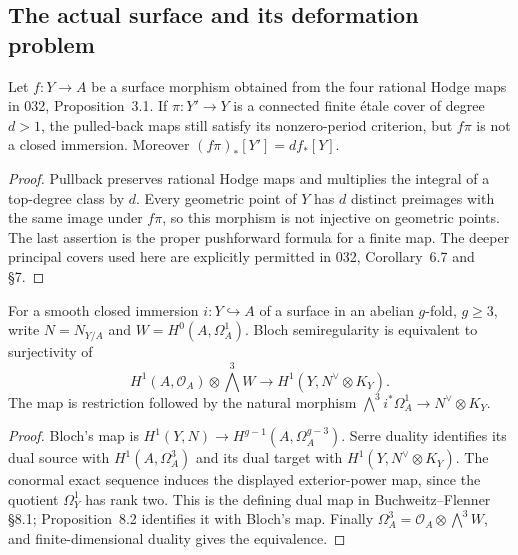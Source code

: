 
\subsection{The actual surface and its deformation problem}

\begin{proposition}
\label{prop:semireg-cover-domain}
Let $f:Y\to A$ be a surface morphism obtained from the four rational
Hodge maps in 032, Proposition~3.1. If $\pi:Y'\to Y$ is a connected finite
\'etale cover of degree $d>1$, the pulled-back maps still satisfy its
nonzero-period criterion, but $f\pi$ is not a closed immersion.
Moreover $(f\pi)_*[Y']=d f_*[Y]$.
\end{proposition}
\begin{proof}
Pullback preserves rational Hodge maps and multiplies the integral of
a top-degree class by $d$. Every geometric point of $Y$ has $d$ distinct
preimages with the same image under $f\pi$, so this morphism is not
injective on geometric points. The last assertion is the proper
pushforward formula for a finite map. The deeper principal covers
used here are explicitly permitted in 032, Corollary~6.7 and \S7.
\end{proof}

\begin{proposition}
\label{prop:semireg-dual-gate}
For a smooth closed immersion $i:Y\hookrightarrow A$ of a surface in
an abelian $g$-fold, $g\geq3$, write $N=N_{Y/A}$ and
$W=H^0(A,\Omega_A^1)$. Bloch semiregularity is equivalent to
surjectivity of
\[
 H^1(A,\mathcal O_A)\otimes\bigwedge^3W
 \longrightarrow H^1(Y,N^\vee\otimes K_Y).
\]
The map is restriction followed by the natural morphism
$\bigwedge^3 i^*\Omega_A^1\to N^\vee\otimes K_Y$.
\end{proposition}
\begin{proof}
Bloch's map is
$H^1(Y,N)\to H^{g-1}(A,\Omega_A^{g-3})$.
Serre duality identifies its dual source with $H^1(A,\Omega_A^3)$
and its dual target with $H^1(Y,N^\vee\otimes K_Y)$.
The conormal exact sequence induces the displayed exterior-power
map, since the quotient $\Omega_Y^1$ has rank two.
This is the defining dual map in Buchweitz--Flenner \S8.1;
Proposition~8.2 identifies it with Bloch's map.
Finally $\Omega_A^3=\mathcal O_A\otimes\bigwedge^3W$,
and finite-dimensional duality gives the equivalence.
\end{proof}

